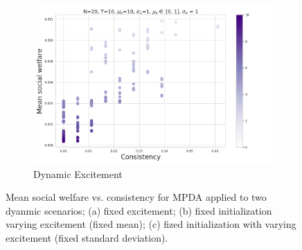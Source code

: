 \begin{figure}
\begin{subfigure}[b]{0.49\textwidth}
         \includegraphics[width=\textwidth]{figures/mpda_dynamics_excitement_mean.png}
         \caption{Dynamic Excitement}
         \label{fig:excite_mean}
     \end{subfigure}
     \caption{Mean social welfare vs. consistency for MPDA applied to two dyanmic scenarios; (a) fixed excitement; (b) fixed initialization varying excitement (fixed mean); (c) fized initialization with varying excitement (fixed standard deviation).}
    \label{fig:mpda_dynamics}
\end{figure}